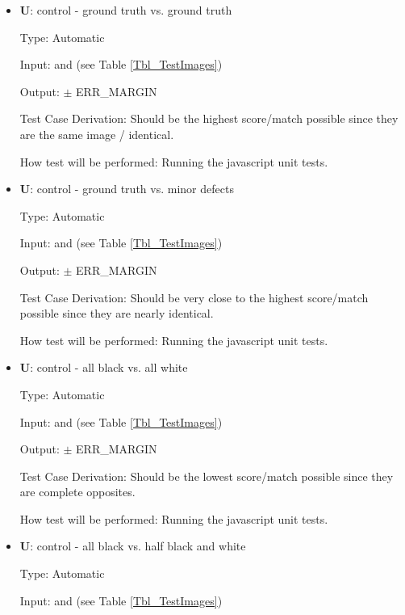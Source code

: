 \documentclass[12pt, titlepage]{article}
\newcommand{\ttref}[1]{Table \ref{#1}}
\newcounter{testnum} %
\newcounter{unittestnum} %
\begin{document}
\begin{itemize}

\item{\textbf{U\theunittestnum \label{U_metric0A}}: control - ground truth vs. ground truth}

Type: Automatic

Input:  and  (see \ttref{Tbl_TestImages})

Output:  $\pm$ ERR\_MARGIN

Test Case Derivation: Should be the highest score/match possible
  since they are the same image / identical.

How test will be performed: Running the javascript unit tests.


\item{\textbf{U\theunittestnum \label{U_metric0B}}: control - ground truth vs. minor defects}

Type: Automatic

Input:  and  (see \ttref{Tbl_TestImages})

Output:  $\pm$ ERR\_MARGIN

Test Case Derivation: Should be very close to the highest score/match possible
  since they are nearly identical.

How test will be performed: Running the javascript unit tests.


\item{\textbf{U\theunittestnum \label{U_metric1}}: control - all black vs. all white}

Type: Automatic

Input:  and  (see \ttref{Tbl_TestImages})

Output:  $\pm$ ERR\_MARGIN

Test Case Derivation: Should be the lowest score/match possible
  since they are complete opposites.

How test will be performed: Running the javascript unit tests.


\item{\textbf{U\theunittestnum \label{U_metric2}}: control - all black vs. half black and white}

Type: Automatic

Input:  and  (see \ttref{Tbl_TestImages})


\end{itemize}
\end{document}
